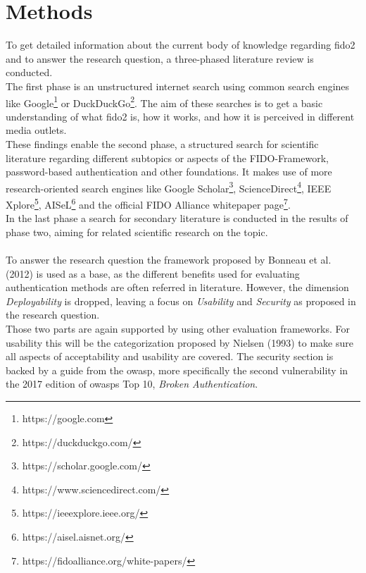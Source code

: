 
\section{Methods}
\label{sec:methods}

To get detailed information about the current body of knowledge regarding \ac{fido2} and to answer the research question, a three-phased literature review is conducted.\\
The first phase is an unstructured internet search using common search engines like Google\footnote{https://google.com} or DuckDuckGo\footnote{https://duckduckgo.com/}. The aim of these searches is to get a basic understanding of what \ac{fido2} is, how it works, and how it is perceived in different media outlets.\\
These findings enable the second phase, a structured search for scientific literature regarding different subtopics or aspects of the FIDO-Framework, password-based authentication and other foundations. It makes use of more research-oriented search engines like Google Scholar\footnote{https://scholar.google.com/}, ScienceDirect\footnote{https://www.sciencedirect.com/}, IEEE Xplore\footnote{https://ieeexplore.ieee.org/}, AISeL\footnote{https://aisel.aisnet.org/} and the official FIDO Alliance whitepaper page\footnote{https://fidoalliance.org/white-papers/}.\\
In the last phase a search for secondary literature is conducted in the results of phase two, aiming for related scientific research on the topic.\\
\\
To answer the research question the framework proposed by Bonneau et al. (2012) \cite{bonneau2012} is used as a base, as the different benefits used for evaluating authentication methods are often referred in literature. However, the dimension \emph{Deployability} is dropped, leaving a focus on \emph{Usability} and \emph{Security} as proposed in the research question.\\
Those two parts are again supported by using other evaluation frameworks. For usability this will be the categorization proposed by Nielsen (1993) to make sure all aspects of acceptability and usability are covered. The security section is backed by a guide from the \ac{owasp}, more specifically the second vulnerability in the 2017 edition of \acp{owasp} Top 10, \emph{Broken Authentication}.